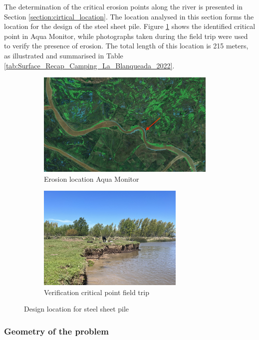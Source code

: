 The determination of the critical erosion points along the river is presented in Section \ref{section:cirtical_location}. The location analysed in this section forms the location for the design of the steel sheet pile. Figure \ref{fig:critical_location_google} shows the identified critical point in Aqua Monitor, while photographs taken during the field trip were used to verify the presence of erosion. The total length of this location is 215 meters, as illustrated and summarised in Table \ref{tab:Surface_Recap_Camping_La_Blanqueada_2022}.

\begin{figure}[H]
    \centering
    \begin{subfigure}[b]{0.45\textwidth}
        \includegraphics[width=\linewidth, height=5cm]{figures/ch8/1985-2025_ch8.jpg}
        \caption{Erosion location Aqua Monitor}
        \label{fig:critical_location_google}
    \end{subfigure}
    \hfill
    \begin{subfigure}[b]{0.45\textwidth}
        \includegraphics[width=\linewidth, height=5cm]{figures/ch8/critical_location.jpeg}
        \caption{Verification critical point field trip}
        \label{fig:critical_location_fieldtrip}
    \end{subfigure}
    \caption{Design location for steel sheet pile}
    \label{fig:critical_location}
\end{figure}

\subsubsection{Geometry of the problem}

